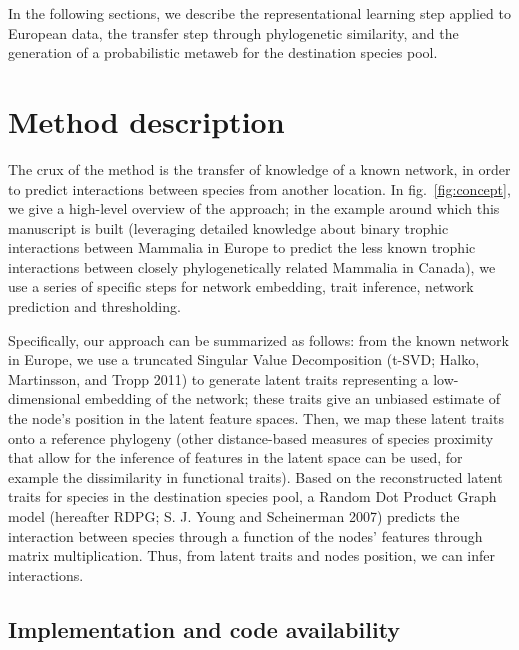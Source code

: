 \documentclass[10pt,oneside]{article}
\begin{document}
In the following sections, we describe the representational learning
step applied to European data, the transfer step through phylogenetic
similarity, and the generation of a probabilistic metaweb for the
destination species pool.

\hypertarget{method-description}{%
\section{Method description}\label{method-description}}

The crux of the method is the transfer of knowledge of a known network,
in order to predict interactions between species from another location.
In fig.~\ref{fig:concept}, we give a high-level overview of the
approach; in the example around which this manuscript is built
(leveraging detailed knowledge about binary trophic interactions between
Mammalia in Europe to predict the less known trophic interactions
between closely phylogenetically related Mammalia in Canada), we use a
series of specific steps for network embedding, trait inference, network
prediction and thresholding.

Specifically, our approach can be summarized as follows: from the known
network in Europe, we use a truncated Singular Value Decomposition
(t-SVD; Halko, Martinsson, and Tropp 2011) to generate latent traits
representing a low-dimensional embedding of the network; these traits
give an unbiased estimate of the node's position in the latent feature
spaces. Then, we map these latent traits onto a reference phylogeny
(other distance-based measures of species proximity that allow for the
inference of features in the latent space can be used, for example the
dissimilarity in functional traits). Based on the reconstructed latent
traits for species in the destination species pool, a Random Dot Product
Graph model (hereafter RDPG; S. J. Young and Scheinerman 2007) predicts
the interaction between species through a function of the nodes'
features through matrix multiplication. Thus, from latent traits and
nodes position, we can infer interactions.

\hypertarget{implementation-and-code-availability}{%
\subsection{Implementation and code
availability}\label{implementation-and-code-availability}}
\end{document}
